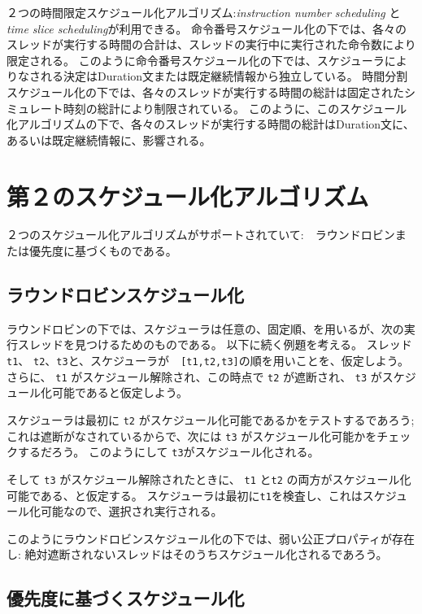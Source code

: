 \documentclass[\pformat,12pt]{jreport}
\begin{document}
２つの時間限定スケジュール化アルゴリズム:\emph{instruction number scheduling} と \emph{time slice scheduling}が利用できる。
命令番号スケジュール化の下では、各々のスレッドが実行する時間の合計は、スレッドの実行中に実行された命令数により限定される。
このように命令番号スケジュール化の下では、スケジューラによりなされる決定はDuration文または既定継続情報から独立している。
時間分割スケジュール化の下では、各々のスレッドが実行する時間の総計は固定されたシミュレート時刻の総計により制限されている。
このように、このスケジュール化アルゴリズムの下で、各々のスレッドが実行する時間の総計はDuration文に、あるいは既定継続情報に、影響される。

\section{第２のスケジュール化アルゴリズム}

２つのスケジュール化アルゴリズムがサポートされていて:　ラウンドロビンまたは優先度に基づくものである。

\subsection{ラウンドロビンスケジュール化}

ラウンドロビンの下では、スケジューラは任意の、固定順、を用いるが、次の実行スレッドを見つけるためのものである。
以下に続く例題を考える。
スレッド \texttt{t1}、 \texttt{t2}、\texttt{t3}と、スケジューラが　\texttt{[t1,t2,t3]}の順を用いことを、仮定しよう。 
さらに、 \texttt{t1} がスケジュール解除され、この時点で \texttt{t2} が遮断され、 \texttt{t3} がスケジュール化可能であると仮定しよう。

スケジューラは最初に \texttt{t2} がスケジュール化可能であるかをテストするであろう;
これは遮断がなされているからで、次には \texttt{t3} がスケジュール化可能かをチェックするだろう。
このようにして \texttt{t3}がスケジュール化される。

そして \texttt{t3} がスケジュール解除されたときに、 \texttt{t1} と\texttt{t2} の両方がスケジュール化可能である、と仮定する。
スケジューラは最初に\texttt{t1}を検査し、これはスケジュール化可能なので、選択され実行される。

このようにラウンドロビンスケジュール化の下では、弱い公正プロパティが存在し\cite{Lamport91}: 絶対遮断されないスレッドはそのうちスケジュール化されるであろう。

\subsection{優先度に基づくスケジュール化}
\end{document}
